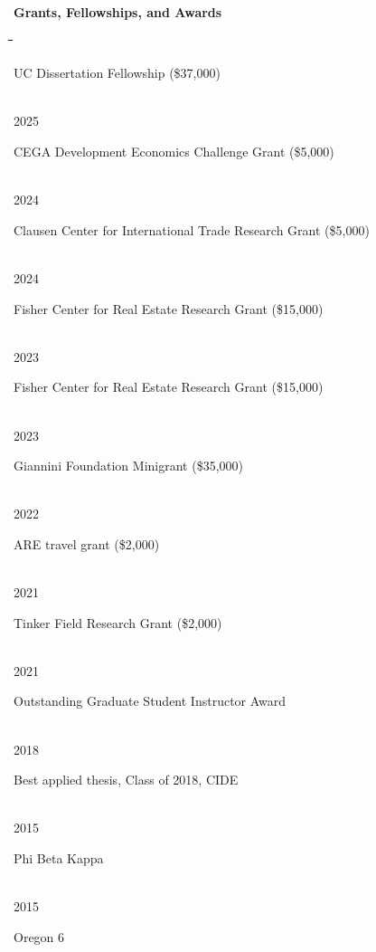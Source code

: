 \documentclass[10pt, oneside]{article}
\makeatletter
\newlength\tdima
\newcommand\tabfill[1]{%
      \setlength\tdima{\linewidth}%
      \addtolength\tdima{\@totalleftmargin}%
      \addtolength\tdima{-\dimen\@curtab}%
      \parbox[t]{\tdima}{#1\ifhmode\strut\fi}}
\newcommand\mytabs{\hspace*{1cm}\=\hspace{1cm}\=\hspace{1cm}\=\hspace{1cm}\=\hspace{1cm}\=\hspace{1cm}\=\hspace{1cm}\=\hspace{1cm}\=\hspace{1cm}\=\hspace{1cm}}
\newenvironment{mysec}[1][\mytabs]
  {\begin{tabbing}#1\kill\ignorespaces}
  {\end{tabbing}}
\makeatother
\begin{document}
\begin{minipage}[t]{0.1\linewidth}
\textbf{Grants, Fellowships, and Awards}
\end{minipage}\hspace{0.05\linewidth}
\begin{minipage}[t]{0.8\linewidth}
\begin{mysec} 
	2025 \>\>\tabfill{UC Dissertation Fellowship (\$37,000)} \\
    2025 \>\>\tabfill{CEGA Development Economics Challenge Grant (\$5,000)} \\
    2024 \>\>\tabfill{Clausen Center for International Trade Research Grant (\$5,000)} \\
    2024 \>\>\tabfill{Fisher Center for Real Estate Research Grant  (\$15,000)} \\
	2023 \>\>\tabfill{Fisher Center for Real Estate Research Grant  (\$15,000)} \\
    2023 \>\>\tabfill{Giannini Foundation Minigrant  (\$35,000)} \\
    2022 \>\>\tabfill{ARE travel grant  (\$2,000)} \\
    2021 \>\>\tabfill{Tinker Field Research Grant (\$2,000)}\\ 
    2021 \>\>\tabfill{Outstanding Graduate Student Instructor Award}\\ 
    2018 \>\>\tabfill{Best applied thesis, Class of 2018, CIDE}\\ 
    2015 \>\>\tabfill{Phi Beta Kappa}\\ 
    2015 \>\>\tabfill{Oregon 6}
\end{mysec} 
\end{minipage}\vspace{5mm}
\end{document}
